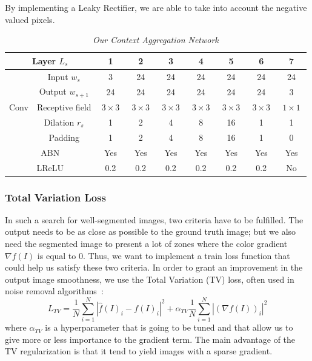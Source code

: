 \documentclass{article}
\begin{document}
            \noindent By implementing a Leaky Rectifier, we are able to take into account the negative valued pixels.

            \begin{table}[!ht]
                \centering
                \begin{tabular}{|c|c||c|cccc|cc|}
                    \hline
                    \multicolumn{2}{|c||}{Layer $L_s$} & 1 & 2 & 3 & 4 & 5 & 6 & 7 \\
                    \hline
                    \hline
                     & Input $w_s$ & 3 & 24 & 24 & 24 & 24 & 24 & 24 \\
                     & Output $w_{s+1}$ & 24 & 24 & 24 & 24 & 24 & 24 & 3 \\
                    \cline{2-9}
                    Conv & Receptive field & $\ 3\times 3\ $ & $\ 3\times 3\ $ & $\ 3\times 3\ $ & $\ 3\times 3\ $ & $\ 3\times 3\ $ & $\ 3\times 3\ $ & $\ 1\times 1\ $ \\
                     & Dilation $r_s$ & 1 & 2 & 4 & 8 & 16 & 1 & 1 \\
                     & Padding & 1 & 2 & 4 & 8 & 16 & 1 & 0 \\
                    \hline
                    \multicolumn{2}{|c||}{ABN} & Yes & Yes & Yes & Yes & Yes & Yes & Yes \\
                    \hline
                    \multicolumn{2}{|c||}{LReLU} & 0.2 & 0.2 & 0.2 & 0.2 & 0.2 & 0.2 & No \\
                    \hline
                \end{tabular}
                \caption{\textit{Our Context Aggregation Network}}
            \end{table}

\newpage
        \subsubsection{Total Variation Loss}
            In such a search for well-segmented images, two criteria have to be fulfilled. The output needs to be as close as possible to the ground truth image; but we also need the segmented image to present a lot of zones where the color gradient $\nabla f(I)$ is equal to $0$. Thus, we want to implement a train loss function that could help us satisfy these two criteria.
            In order to grant an improvement in the output image smoothness, we use the Total Variation (TV) loss, often used in noise removal algorithms~\cite{rudin1992,chambolle2004}:
            $$
            L_{TV}=\frac{1}{N}\sum_{i=1}^N |\hat{f}(I)_i-f(I)_i|^2+\alpha_{TV}\frac{1}{N}\sum_{i=1}^N|(\nabla f(I))_i|^2
            $$
            where $\alpha_{TV}$ is a hyperparameter that is going to be tuned and that allow us to give more or less importance to the gradient term. The main advantage of the TV regularization is that it tend to yield images with a sparse gradient.
\end{document}
